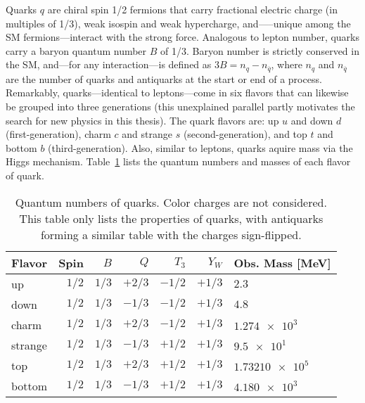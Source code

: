 Quarks $q$ are chiral spin 1/2 fermions that carry fractional electric charge (in multiples of 1/3), weak isospin and weak hypercharge, and—--unique among the SM fermions---interact with the strong force. Analogous to lepton number, quarks carry a baryon quantum number $B$ of 1/3. Baryon number is strictly conserved in the SM, and---for any interaction---is defined as $3B=n_q-n_{\overline{q}}$, where $n_q$ and $n_{\overline{q}}$ are the number of quarks and antiquarks at the start or end of a process. Remarkably, quarks---identical to leptons---come in six flavors that can likewise be grouped into three generations (this unexplained parallel partly motivates the search for new physics in this thesis). The quark flavors are: up $u$ and down $d$ (first-generation), charm $c$ and strange $s$ (second-generation), and top $t$ and bottom $b$ (third-generation). Also, similar to leptons, quarks aquire mass via the Higgs mechanism. Table~\ref{tab:quarks} lists the quantum numbers and masses of each flavor of quark.
\begin{table}[H]
    \begin{center}
        \caption{Quantum numbers of quarks. Color charges are not considered. This table only lists the properties of quarks, with antiquarks forming a similar table with the charges sign-flipped.}
        \begin{tabular}{lrrrrrl}
            \hline \hline
            Flavor   & Spin  & $B$   & $Q$       & $T_3$     & $Y_W$   & Obs. Mass [MeV] \\ \hline
            up       & $1/2$ & $1/3$ & $+2/3$    & $-1/2$    & $+1/3$  & $\num{2.3}$ \\
            down     & $1/2$ & $1/3$ & $-1/3$    & $-1/2$    & $+1/3$  & $\num{4.8}$ \\
            charm    & $1/2$ & $1/3$ & $+2/3$    & $-1/2$    & $+1/3$  & $\num{1.274e3}$ \\
            strange  & $1/2$ & $1/3$ & $-1/3$    & $+1/2$    & $+1/3$  & $\num{9.5e1}$ \\
            top      & $1/2$ & $1/3$ & $+2/3$    & $+1/2$    & $+1/3$  & $\num{1.73210e5}$ \\
            bottom   & $1/2$ & $1/3$ & $-1/3$    & $+1/2$    & $+1/3$  & $\num{4.180e3}$ \\ \hline \hline
        \end{tabular}
        \label{tab:quarks}
    \end{center}
\end{table}

